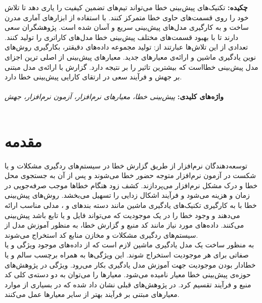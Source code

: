 \thispagestyle{empty}
\noindent
\renewcommand*\thesection{\arabic{section}}
\textbf{\large{چکیده:}}
تکنیک‌های پیش‌بینی خطا می‌تواند تیم‌های تضمین کیفیت را یاری دهد تا تلاش خود را  روی قسمت‌های حاوی خطا متمرکز کنند. با استفاده از ابزارهای آماری مدرن  ساخت و به کارگیری مدل‌های پیش‌بینی سریع و آسان شده است. پژوهشگران سعی دارند تا با بهبود قسمت‌های مختلف پیش‌بینی خطا مدل‌های کاراتری را تولید کنند. تعدادی از این تلاش‌ها عبارتند از: ‌تولید مجموعه داده‌های دقیقتر، بکارگیری روش‌های نوین یادگیری ماشین و ارائه‌ی معیارهای جدید. معیارهای پیش‌بینی از اصلی ترین اجزای مدل پیش‌بینی  خطااست که بیشترین تاثیر را بر نتیجه دارد.  گزارش با‌ ارائه‌ی مدل مبتنی بر جهش و فرآیند سعی در ارتقای کارایی پیش‌بینی خطا دارد. 
\\\\
\textbf{واژه‌های کلیدی:}\textit{ 
پیش‌بینی خطا، معیارهای ‌نرم‌افزار، آزمون ‌نرم‌افزار، جهش
}\\\\
\section{مقدمه}
\label{sec:intro}
  توسعه‌دهندگان نرم‌افزار از طریق گزارش خطا در سیستم‌های ردگیری مشکلات و یا شکست در آزمون نرم‌افزار متوجه حضور خطا می‌شوند و پس از آن به جستجوی محل خطا و درک مشکل  نرم‌افزار می‌پردازند. کشف زود هنگام خطاها موجب صرفه‌جویی در زمان و هزینه می‌شود و فرآیند اشکال زدایی را تسهیل می‌بخشد. روش‌های پیش‌بینی خطا با به کارگیری تکنیک‌های یادگیری ماشین مانند دسته ‌بندهای  و  ، مدلی مناسب ارائه می‌دهند و وجود خطا را در یک موجودیت که می‌تواند فایل و یا تابع باشد پیش‌بینی می‌کنند. داده‌های مورد نیاز مانند کد منبع و گزارش خطا، به منظور آموزش مدل از سیستم‌های ردگیری مشکلات و مخازن منابع کد استخراج می‌شوند. \\
  
 به منظور ساخت یک مدل یادگیری ماشین لازم است که از داده‌های موجود ویژگی و یا صفاتی  برای هر موجودیت استخراج شوند. این ویژگی‌ها به همراه برچسب سالم و یا خطادار بودن موجودیت جهت آموزش مدل یادگیری بکار می‌رود.  ویژگی  در پژوهش‌های حوزه‌ی پیش‌بینی خطا معیار  نامیده می‌شود.  معیارها را می‌توان به دو دسته‌ی کلی کد منبع و فرآیند تقسیم کرد. در پژوهش‌های قبلی نشان داد شده که در بسیاری از موارد معیارهای مبتنی بر فرآیند بهتر از سایر معیارها عمل می‌کنند\cite{rahman2013and}\cite{radjenovic2013software}. \\
 
